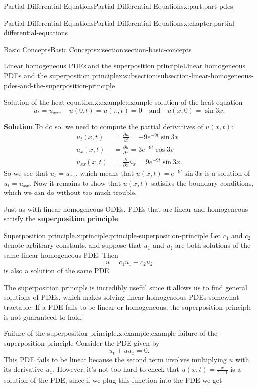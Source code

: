 \documentclass[twoside,10pt,]{book}
\newcommand{\blocktitlefont}{\relax}
\newcommand{\terminology}[1]{\textbf{#1}}
\numberwithin{equation}{part}
\newcommand{\amp}{&}
\begin{document}
\begin{partptx}{Partial Differential Equations}{}{Partial Differential Equations}{}{}{x:part:part-pdes}
\begin{chapterptx}{Partial Differential Equations}{}{Partial Differential Equations}{}{}{x:chapter:partial-differential-equations}
\begin{sectionptx}{Basic Concepts}{}{Basic Concepts}{}{}{x:section:section-basic-concepts}
\begin{subsectionptx}{Linear homogeneous PDEs and the superposition principle}{}{Linear homogeneous PDEs and the superposition principle}{}{}{x:subsection:subsection-linear-homogeneous-pdes-and-the-superposition-principle}
\begin{example}{Solution of the heat equation.}{x:example:example-solution-of-the-heat-equation}
\begin{equation*}
u_{t} = u_{xx},\quad u(0,t) = u(\pi,t) = 0\quad\text{and}\quad u(x,0) = \sin3x.
\end{equation*}
%
\par\smallskip%
\noindent\textbf{\blocktitlefont Solution}.\hypertarget{g:solution:idp105548817003040}{}\quad{}To do so, we need to compute the partial derivatives of \(u(x,t):\)%
%
\begin{align*}
u_{t}(x,t) \amp = \frac{\partial u}{\partial t} = -9e^{-9t}\sin3x \\
u_{x}(x,t) \amp = \frac{\partial u}{\partial x} = 3e^{-9t}\cos3x \\
u_{xx}(x,t) \amp = \frac{\partial}{\partial x}u_{x} = 9e^{-9t}\sin3x \text{.}
\end{align*}
So we see that \(u_{t} = u_{xx}\), which means that \(u(x,t) = e^{-9t}\sin3x\) is a solution of \(u_{t} = u_{xx}\). Now it remains to show that \(u(x,t)\) satisfies the boundary conditions, which we can do without too much trouble.%
\end{example}
Just as with linear homogeneous ODEs, PDEs that are linear and homogeneous satisfy the \terminology{superposition principle}.%
\begin{principle}{Superposition principle.}{}{x:principle:principle-superposition-principle}%
%
Let \(c_{1}\) and \(c_{2}\) denote arbitrary constants, and suppose that \(u_{1}\) and \(u_{2}\) are both solutions of the same linear homogeneous PDE. Then%
\begin{equation*}
u = c_{1}u_{1}+c_{2}u_{2}
\end{equation*}
is also a solution of the same PDE.%
\end{principle}
The superposition principle is incredibly useful since it allows us to find general solutions of PDEs, which makes solving linear homogeneous PDEs somewhat tractable. If a PDE fails to be linear or homogeneous, the superposition principle is not guaranteed to hold.%
\begin{example}{Failure of the superposition principle.}{x:example:example-failure-of-the-superposition-principle}%
Consider the PDE given by%
\begin{equation*}
u_{t}+uu_{x} = 0.
\end{equation*}
This PDE fails to be linear because the second term involves multiplying \(u\) with its derivative \(u_{x}\). However, it's not too hard to check that \(u(x,t) = \frac{x}{t+1}\) is a solution of the PDE, since if we plug this function into the PDE we get%

\end{example}
\end{subsectionptx}
\end{sectionptx}
\end{chapterptx}
\end{partptx}
\end{document}
